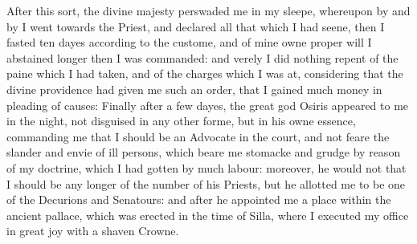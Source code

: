 After this sort, the divine majesty perswaded me in my sleepe, whereupon by and
by I went towards the Priest, and declared all that which I had seene, then I
fasted ten dayes according to the custome, and of mine owne proper will I
abstained longer then I was commanded: and verely I did nothing repent of the
paine which I had taken, and of the charges which I was at, considering that
the divine providence had given me such an order, that I gained much money in
pleading of causes: Finally after a few dayes, the great god Osiris appeared to
me in the night, not disguised in any other forme, but in his owne essence,
commanding me that I should be an Advocate in the court, and not feare the
slander and envie of ill persons, which beare me stomacke and grudge by reason
of my doctrine, which I had gotten by much labour: moreover, he would not that
I should be any longer of the number of his Priests, but he allotted me to be
one of the Decurions and Senatours: and after he appointed me a place within
the ancient pallace, which was erected in the time of Silla, where I executed
my office in great joy with a shaven Crowne.
